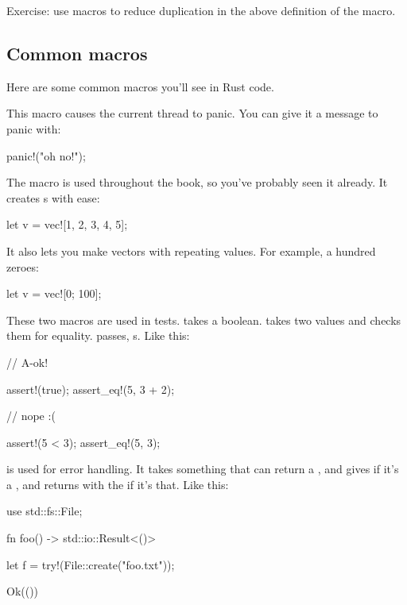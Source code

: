 Exercise: use macros to reduce duplication in the above definition of the  macro.

\subsection*{Common macros}

Here are some common macros you'll see in Rust code.


This macro causes the current thread to panic. You can give it a message to panic with:

\begin{rustc}
panic!("oh no!");
\end{rustc}


The  macro is used throughout the book, so you've probably seen it already. It creates s with ease:

\begin{rustc}
let v = vec![1, 2, 3, 4, 5];
\end{rustc}

It also lets you make vectors with repeating values. For example, a hundred zeroes:

\begin{rustc}
let v = vec![0; 100];
\end{rustc}


These two macros are used in tests.  takes a boolean.  takes two values and checks them for equality. 
 passes,  \panic s. Like this:

\begin{rustc}
// A-ok!

assert!(true);
assert_eq!(5, 3 + 2);

// nope :(

assert!(5 < 3);
assert_eq!(5, 3);
\end{rustc}


 is used for error handling. It takes something that can return a , and gives  if it's a ,
and returns with the  if it's that. Like this:

\begin{rustc}
use std::fs::File;

fn foo() -> std::io::Result<()> {
    let f = try!(File::create("foo.txt"));

    Ok(())
}
\end{rustc}

